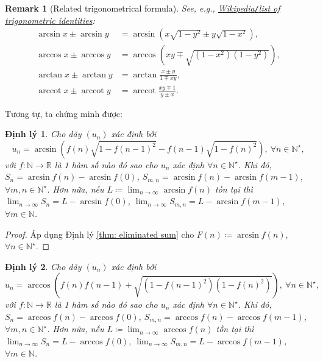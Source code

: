 \documentclass{article}
\newtheorem{dinhly}{Định lý}
\newtheorem{remark}{Remark}
\begin{document}
\begin{remark}[Related trigonometrical formula]
	See, e.g., \href{https://en.wikipedia.org/wiki/List_of_trigonometric_identities}{Wikipedia{\tt/}list of trigonometric identities}:
	\begin{align*}
		\arcsin x\pm\arcsin y &= \arcsin(x\sqrt{1 - y^2}\pm y\sqrt{1 - x^2}),\\
		\arccos x\pm\arccos y &= \arccos\left(xy\mp\sqrt{(1 - x^2)(1 - y^2)}\right),\\
		\arctan x\pm\arctan y &= \arctan\frac{x\pm y}{1\mp xy},\\
		\operatorname{arccot}x\pm\operatorname{arccot}y &= \operatorname{arccot}\frac{xy\mp1}{y\pm x}.
	\end{align*}
\end{remark}
Tương tự, ta chứng minh được:

\begin{dinhly}
	Cho dãy $(u_n)$ xác định bởi
	\begin{equation*}
		u_n = \arcsin\left(f(n)\sqrt{1 - f(n-1)^2} - f(n-1)\sqrt{1 - f(n)^2}\right),\ \forall n\in\mathbb{N}^\star,
	\end{equation*}
	với $f:\mathbb{N}\to\mathbb{R}$ là 1 hàm số nào đó sao cho $u_n$ xác định $\forall n\in\mathbb{N}^\star$. Khi đó, $S_n = \arcsin f(n) - \arcsin f(0)$, $S_{m,n} = \arcsin f(n) - \arcsin f(m - 1)$, $\forall m,n\in\mathbb{N}^\star$. Hơn nữa, nếu $L\coloneqq\lim_{n\to\infty} \arcsin f(n)$ tồn tại thì $\lim_{n\to\infty} S_n = L - \arcsin f(0)$, $\lim_{n\to\infty} S_{m,n} = L - \arcsin f(m - 1)$, $\forall m\in\mathbb{N}$.
\end{dinhly}

\begin{proof}
	Áp dụng Định lý \ref{thm: eliminated sum} cho $F(n)\coloneqq\arcsin f(n)$, $\forall n\in\mathbb{N}^\star$.
\end{proof}

\begin{dinhly}
	Cho dãy $(u_n)$ xác định bởi
	\begin{equation*}
		u_n = \arccos\left(f(n)f(n-1) + \sqrt{(1 - f(n-1)^2)(1 - f(n)^2)}\right),\ \forall n\in\mathbb{N}^\star,
	\end{equation*}
	với $f:\mathbb{N}\to\mathbb{R}$ là 1 hàm số nào đó sao cho $u_n$ xác định $\forall n\in\mathbb{N}^\star$. Khi đó, $S_n = \arccos f(n) - \arccos f(0)$, $S_{m,n} = \arccos f(n) - \arccos f(m - 1)$, $\forall m,n\in\mathbb{N}^\star$. Hơn nữa, nếu $L\coloneqq\lim_{n\to\infty} \arccos f(n)$ tồn tại thì $\lim_{n\to\infty} S_n = L - \arccos f(0)$, $\lim_{n\to\infty} S_{m,n} = L - \arccos f(m - 1)$, $\forall m\in\mathbb{N}$.
\end{dinhly}
\end{document}
